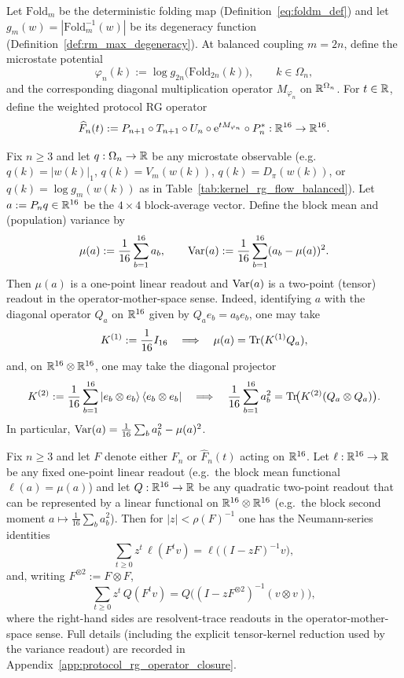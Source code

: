 \begin{definition}\label{def:weighted_protocol_rg_operator}
\InterfaceTag Let $\mathrm{Fold}_m$ be the deterministic folding map (Definition~\eqref{eq:foldm_def}) and let $g_m(w)=|\mathrm{Fold}_m^{-1}(w)|$ be its degeneracy function (Definition~\ref{def:rm_max_degeneracy}).
At balanced coupling $m=2n$, define the microstate potential
\[
\varphi_n(k):=\log g_{2n}\!\bigl(\mathrm{Fold}_{2n}(k)\bigr),
\qquad k\in\Omega_n,
\]
and the corresponding diagonal multiplication operator $M_{\varphi_n}$ on $\mathbb{R}^{\Omega_n}$.
For $t\in\mathbb{R}$, define the weighted protocol RG operator
\[
\widehat F_n(t):=P_{n+1}\circ T_{n+1}\circ U_n\circ \mathrm{e}^{tM_{\varphi_n}}\circ P_n^\ast:\mathbb{R}^{16}\to\mathbb{R}^{16}.
\]
\end{definition}

\begin{theorem}\label{thm:block_readout_one_two_point}
\MathTag Fix $n\ge 3$ and let $q:\Omega_n\to\mathbb{R}$ be any microstate observable (e.g.\ $q(k)=|w(k)|_1$, $q(k)=V_m(w(k))$, $q(k)=D_\pi(w(k))$, or $q(k)=\log g_m(w(k))$ as in Table~\ref{tab:kernel_rg_flow_balanced}).
Let $a:=P_n q\in\mathbb{R}^{16}$ be the $4\times 4$ block-average vector.
Define the block mean and (population) variance by
\[
\mu(a):=\frac{1}{16}\sum_{b=1}^{16} a_b,
\qquad
\mathrm{Var}(a):=\frac{1}{16}\sum_{b=1}^{16}(a_b-\mu(a))^2.
\]
Then $\mu(a)$ is a one-point linear readout and $\mathrm{Var}(a)$ is a two-point (tensor) readout in the operator-mother-space sense.
Indeed, identifying $a$ with the diagonal operator $Q_a$ on $\mathbb{R}^{16}$ given by $Q_a e_b=a_b e_b$, one may take
\[
K^{(1)}:=\frac{1}{16}I_{16}
\quad\Longrightarrow\quad
\mu(a)=\mathrm{Tr}(K^{(1)}Q_a),
\]
and, on $\mathbb{R}^{16}\otimes\mathbb{R}^{16}$, one may take the diagonal projector
\[
K^{(2)}:=\frac{1}{16}\sum_{b=1}^{16}\ket{e_b\otimes e_b}\bra{e_b\otimes e_b}
\quad\Longrightarrow\quad
\frac{1}{16}\sum_{b=1}^{16} a_b^2=\mathrm{Tr}\!\bigl(K^{(2)}(Q_a\otimes Q_a)\bigr).
\]
In particular, $\mathrm{Var}(a)=\frac{1}{16}\sum_b a_b^2-\mu(a)^2$.
\end{theorem}

\begin{theorem}\label{thm:resolvent_trace_closure_protocol_rg}
\MathTag Fix $n\ge 3$ and let $F$ denote either $F_n$ or $\widehat F_n(t)$ acting on $\mathbb{R}^{16}$.
Let $\ell:\mathbb{R}^{16}\to\mathbb{R}$ be any fixed one-point linear readout (e.g.\ the block mean functional $\ell(a)=\mu(a)$) and let $Q:\mathbb{R}^{16}\to\mathbb{R}$ be any quadratic two-point readout that can be represented by a linear functional on $\mathbb{R}^{16}\otimes\mathbb{R}^{16}$ (e.g.\ the block second moment $a\mapsto \frac{1}{16}\sum_b a_b^2$).
Then for $|z|<\rho(F)^{-1}$ one has the Neumann-series identities
\[
\sum_{t\ge 0} z^t\,\ell(F^t v)=\ell\!\bigl((I-zF)^{-1}v\bigr),
\]
and, writing $F^{\otimes 2}:=F\otimes F$,
\[
\sum_{t\ge 0} z^t\,Q(F^t v)=Q\!\bigl((I-zF^{\otimes 2})^{-1}(v\otimes v)\bigr),
\]
where the right-hand sides are resolvent-trace readouts in the operator-mother-space sense.
Full details (including the explicit tensor-kernel reduction used by the variance readout) are recorded in Appendix~\ref{app:protocol_rg_operator_closure}.
\end{theorem}

